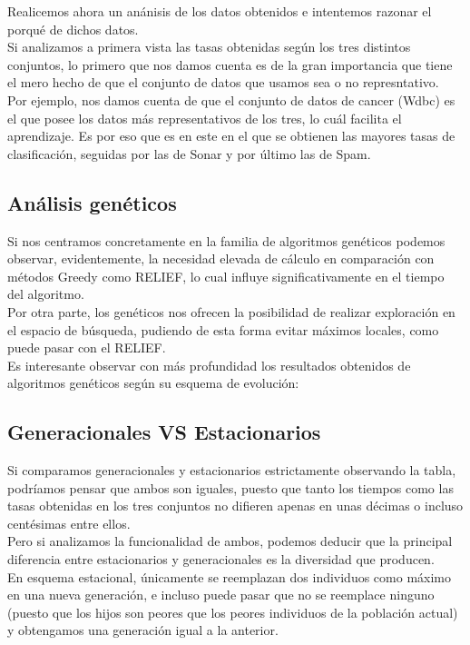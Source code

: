 Realicemos ahora un anánisis de los datos obtenidos e intentemos razonar el porqué de dichos datos.\\ 

Si analizamos a primera vista las tasas obtenidas según los tres distintos conjuntos, lo primero que nos damos cuenta es de la gran importancia que tiene el mero hecho de que el conjunto de datos que usamos sea o no represntativo.\\ 
Por ejemplo, nos damos cuenta de que el conjunto de datos de cancer (Wdbc) es el que posee los datos más representativos de los tres, lo cuál facilita el aprendizaje. Es por eso que es en este en el que se obtienen las mayores tasas de clasificación, seguidas por las de Sonar y por último las de Spam. 
\subsection{Análisis genéticos}
Si nos centramos concretamente en la familia de algoritmos genéticos podemos observar, evidentemente, la necesidad elevada de cálculo en comparación con métodos Greedy como RELIEF, lo cual influye significativamente en el tiempo del algoritmo.\\ 
Por otra parte, los genéticos nos ofrecen la posibilidad de realizar exploración en el espacio de búsqueda, pudiendo de esta forma evitar máximos locales, como puede pasar con el RELIEF.\\ 

Es interesante observar con más profundidad los resultados obtenidos de algoritmos genéticos según
su esquema de evolución:

\subsection{Generacionales VS Estacionarios}
Si comparamos generacionales y estacionarios estrictamente observando la tabla, podríamos pensar que ambos son iguales, puesto que tanto los tiempos como las tasas obtenidas en los tres conjuntos no difieren apenas en unas décimas o incluso centésimas entre ellos.\\ 

Pero si analizamos la funcionalidad de ambos, podemos deducir que la principal diferencia entre estacionarios y generacionales es la diversidad que producen. \\ 
En esquema estacional, únicamente se reemplazan dos individuos como máximo en una nueva generación, e incluso puede pasar que no se reemplace ninguno (puesto que los hijos son peores que los peores individuos de la población actual) y obtengamos una generación igual a la anterior. \\ 


